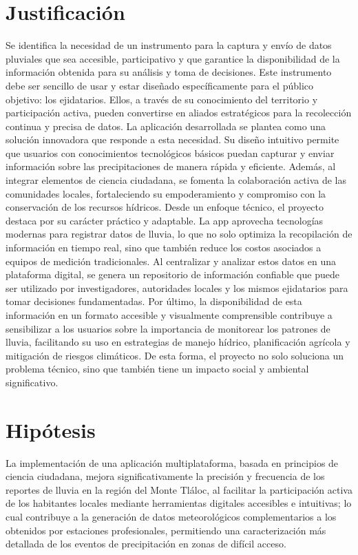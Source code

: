 \section{Justificación}
Se identifica la necesidad de un instrumento para la captura y envío de datos pluviales que sea accesible, participativo y que garantice la disponibilidad de la información obtenida para su análisis y toma de decisiones. Este instrumento debe ser sencillo de usar y estar diseñado específicamente para el público objetivo: los ejidatarios. Ellos, a través de su conocimiento del territorio y participación activa, pueden convertirse en aliados estratégicos para la recolección continua y precisa de datos.
La aplicación desarrollada se plantea como una solución innovadora que responde a esta necesidad. Su diseño intuitivo permite que usuarios con conocimientos tecnológicos básicos puedan capturar y enviar información sobre las precipitaciones de manera rápida y eficiente. Además, al integrar elementos de ciencia ciudadana, se fomenta la colaboración activa de las comunidades locales, fortaleciendo su empoderamiento y compromiso con la conservación de los recursos hídricos.
Desde un enfoque técnico, el proyecto destaca por su carácter práctico y adaptable. La app aprovecha tecnologías modernas para registrar datos de lluvia, lo que no solo optimiza la recopilación de información en tiempo real, sino que también reduce los costos asociados a equipos de medición tradicionales. Al centralizar y analizar estos datos en una plataforma digital, se genera un repositorio de información confiable que puede ser utilizado por investigadores, autoridades locales y los mismos ejidatarios para tomar decisiones fundamentadas. 
Por último, la disponibilidad de esta información en un formato accesible y visualmente comprensible contribuye a sensibilizar a los usuarios sobre la importancia de monitorear los patrones de lluvia, facilitando su uso en estrategias de manejo hídrico, planificación agrícola y mitigación de riesgos climáticos. De esta forma, el proyecto no solo soluciona un problema técnico, sino que también tiene un impacto social y ambiental significativo.

\section{Hipótesis}

La implementación de una aplicación multiplataforma, basada en principios de ciencia ciudadana, mejora significativamente la precisión y frecuencia de los reportes de lluvia en la región del Monte Tláloc, al facilitar la participación activa de los habitantes locales mediante herramientas digitales accesibles e intuitivas; lo cual contribuye a la generación de datos meteorológicos complementarios a los obtenidos por estaciones profesionales, permitiendo una caracterización más detallada de los eventos de precipitación en zonas de difícil acceso.



